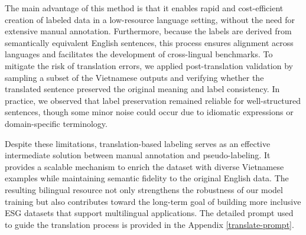 \documentclass[12pt, letterpaper]{template}
\begin{document}
{{{The main advantage of this method is that it enables rapid and cost-efficient creation of labeled data in a low-resource language setting, without the need for extensive manual annotation. Furthermore, because the labels are derived from semantically equivalent English sentences, this process ensures alignment across languages and facilitates the development of cross-lingual benchmarks. To mitigate the risk of translation errors, we applied post-translation validation by sampling a subset of the Vietnamese outputs and verifying whether the translated sentence preserved the original meaning and label consistency. In practice, we observed that label preservation remained reliable for well-structured sentences, though some minor noise could occur due to idiomatic expressions or domain-specific terminology.

Despite these limitations, translation-based labeling serves as an effective intermediate solution between manual annotation and pseudo-labeling. It provides a scalable mechanism to enrich the dataset with diverse Vietnamese examples while maintaining semantic fidelity to the original English data. The resulting bilingual resource not only strengthens the robustness of our model training but also contributes toward the long-term goal of building more inclusive ESG datasets that support multilingual applications.  The detailed prompt used to guide the translation process is provided in the Appendix \ref{translate-prompt}.



}}}
\end{document}
